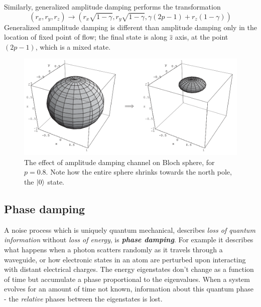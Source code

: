Similarly, generalized amplitude damping performs the transformation
\begin{equation}
    (r_x, r_y, r_z) \longrightarrow \left( r_x\sqrt{1-\gamma}, r_y\sqrt{1-\gamma}, \gamma(2p-1) + r_z(1-\gamma) \right)
\end{equation}
Generalized ammplitude damping is different than amplitude damping only in the location of fixed point of flow; the final state is along $\hat{z}$ axis, at the point $(2p-1)$, which is a mixed state.
\begin{figure}[H]
    \centering
    \includegraphics[width=\textwidth]{images/gad_bloch.png}
    \caption{The effect of amplitude damping channel on Bloch sphere, for $p=0.8$. Note how the entire sphere shrinks towards the north pole, the $\ket{0}$ state.}
    \label{fig:gad_bloch}
\end{figure}

\subsection{Phase damping}
A noise process which is uniquely quantum mechanical, describes \textit{loss of quantum information} without \textit{loss of energy}, is \textit{\textbf{phase damping}}. For example it describes what happens when a photon scatters randomly as it travels through a waveguide, or how electronic states in an atom are perturbed upon interacting with distant electrical charges. The energy eigenstates don't change as a function of time but accumulate a phase proportional to the eigenvalues. When a system evolves for an amount of time not known, information about this quantum phase - the \textit{relative} phases between the eigenstates is lost.